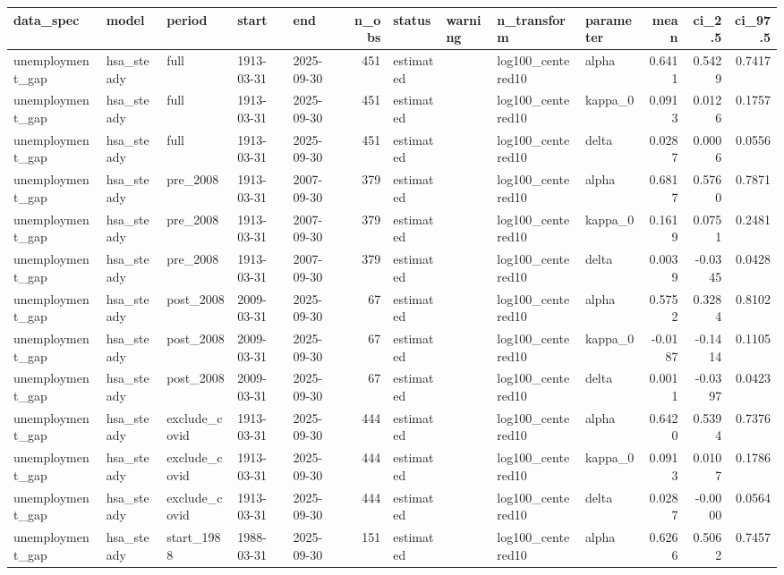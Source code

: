 \begin{tabular}{lllllrllllrrr}
\toprule
data\_spec & model & period & start & end & n\_obs & status & warning & n\_transform & parameter & mean & ci\_2.5 & ci\_97.5 \\
\midrule
unemployment\_gap & hsa\_steady & full & 1913-03-31 & 2025-09-30 & 451 & estimated &  & log100\_centered10 & alpha & 0.6411 & 0.5429 & 0.7417 \\
unemployment\_gap & hsa\_steady & full & 1913-03-31 & 2025-09-30 & 451 & estimated &  & log100\_centered10 & kappa\_0 & 0.0913 & 0.0126 & 0.1757 \\
unemployment\_gap & hsa\_steady & full & 1913-03-31 & 2025-09-30 & 451 & estimated &  & log100\_centered10 & delta & 0.0287 & 0.0006 & 0.0556 \\
unemployment\_gap & hsa\_steady & pre\_2008 & 1913-03-31 & 2007-09-30 & 379 & estimated &  & log100\_centered10 & alpha & 0.6817 & 0.5760 & 0.7871 \\
unemployment\_gap & hsa\_steady & pre\_2008 & 1913-03-31 & 2007-09-30 & 379 & estimated &  & log100\_centered10 & kappa\_0 & 0.1619 & 0.0751 & 0.2481 \\
unemployment\_gap & hsa\_steady & pre\_2008 & 1913-03-31 & 2007-09-30 & 379 & estimated &  & log100\_centered10 & delta & 0.0039 & -0.0345 & 0.0428 \\
unemployment\_gap & hsa\_steady & post\_2008 & 2009-03-31 & 2025-09-30 & 67 & estimated &  & log100\_centered10 & alpha & 0.5752 & 0.3284 & 0.8102 \\
unemployment\_gap & hsa\_steady & post\_2008 & 2009-03-31 & 2025-09-30 & 67 & estimated &  & log100\_centered10 & kappa\_0 & -0.0187 & -0.1414 & 0.1105 \\
unemployment\_gap & hsa\_steady & post\_2008 & 2009-03-31 & 2025-09-30 & 67 & estimated &  & log100\_centered10 & delta & 0.0011 & -0.0397 & 0.0423 \\
unemployment\_gap & hsa\_steady & exclude\_covid & 1913-03-31 & 2025-09-30 & 444 & estimated &  & log100\_centered10 & alpha & 0.6420 & 0.5394 & 0.7376 \\
unemployment\_gap & hsa\_steady & exclude\_covid & 1913-03-31 & 2025-09-30 & 444 & estimated &  & log100\_centered10 & kappa\_0 & 0.0913 & 0.0107 & 0.1786 \\
unemployment\_gap & hsa\_steady & exclude\_covid & 1913-03-31 & 2025-09-30 & 444 & estimated &  & log100\_centered10 & delta & 0.0287 & -0.0000 & 0.0564 \\
unemployment\_gap & hsa\_steady & start\_1988 & 1988-03-31 & 2025-09-30 & 151 & estimated &  & log100\_centered10 & alpha & 0.6266 & 0.5062 & 0.7457 \\

\end{tabular}
